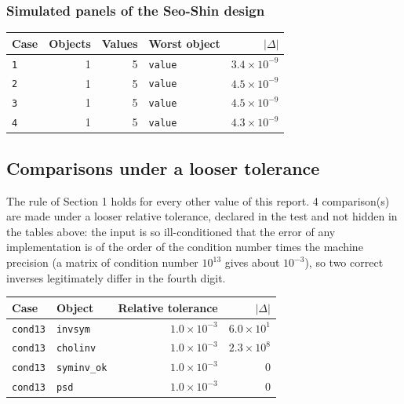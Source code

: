 \subsubsection*{Simulated panels of the Seo-Shin design}

\begin{longtable}{@{}p{3.6cm}rrp{4.9cm}r@{}}
\toprule
Case & Objects & Values & Worst object & $|\Delta|$ \\
\midrule
\endhead
\texttt{1} & 1 & 5 & \texttt{value} & $3.4\times10^{-9}$ \\
\texttt{2} & 1 & 5 & \texttt{value} & $4.5\times10^{-9}$ \\
\texttt{3} & 1 & 5 & \texttt{value} & $4.5\times10^{-9}$ \\
\texttt{4} & 1 & 5 & \texttt{value} & $4.3\times10^{-9}$ \\
\bottomrule
\end{longtable}

\subsection{Comparisons under a looser tolerance}
The rule of Section 1 holds for every other value of this report. 4 comparison(s) are made under a looser relative tolerance, declared in the test and not hidden in the tables above: the input is so ill-conditioned that the error of any implementation is of the order of the condition number times the machine precision (a matrix of condition number $10^{13}$ gives about $10^{-3}$), so two correct inverses legitimately differ in the fourth digit.
\begin{longtable}{@{}p{3cm}p{3cm}rr@{}}
\toprule
Case & Object & Relative tolerance & $|\Delta|$ \\
\midrule
\endhead
\texttt{cond13} & \texttt{invsym} & $1.0\times10^{-3}$ & $6.0\times10^{1}$ \\
\texttt{cond13} & \texttt{cholinv} & $1.0\times10^{-3}$ & $2.3\times10^{8}$ \\
\texttt{cond13} & \texttt{syminv\_\allowbreak{}ok} & $1.0\times10^{-3}$ & 0 \\
\texttt{cond13} & \texttt{psd} & $1.0\times10^{-3}$ & 0 \\
\bottomrule
\end{longtable}

